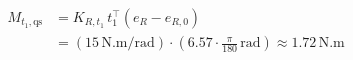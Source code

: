 \documentclass[border=3pt]{standalone}
\begin{document}
{\fontsize{20}{25}\selectfont \color{black}$\displaystyle
\begin{aligned}
M_{t_1,\mathrm{qs}}&=K_{R,t_1}\,t_1^\top(e_R-e_{R,0})\\[2pt]
&=\left(15\,\mathrm{N.m/rad}\right)\cdot
\left(6.57\cdot\frac{\pi}{180}\,\mathrm{rad}\right)
\approx1.72\,\mathrm{N.m}
\end{aligned}$}
\end{document}
